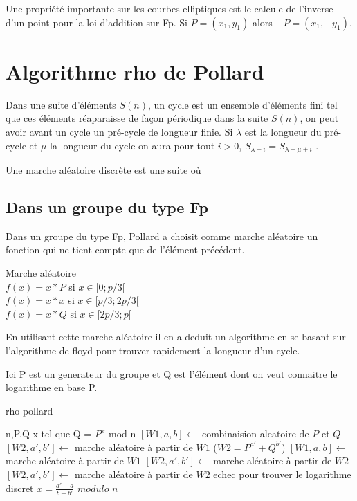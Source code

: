 \documentclass[a4paper,10pt]{report}
\begin{document}
Une propriété importante sur les courbes elliptiques est le calcule de l'inverse d'un point pour la loi d'addition sur Fp. Si $P = (x_1,y_1)$ alors $-P = (x_1,-y_1)$.

\section{Algorithme rho de Pollard}

Dans une suite d'éléments $S(n)$, un cycle est un ensemble d'éléments fini tel que ces éléments réaparaisse de façon périodique dans la suite $S(n)$, on peut avoir avant un cycle un pré-cycle de longueur finie.
Si $\lambda$ est la longueur du pré-cycle et $\mu$ la longueur du cycle on aura pour tout $i > 0$, $S_{\lambda+i} = S_{\lambda+\mu+i}$ .

Une marche aléatoire discrète est une suite où 

\subsection{Dans un groupe du type Fp}

Dans un groupe du type Fp, Pollard a choisit comme marche aléatoire un fonction qui ne tient compte que de l'élément précédent.\\

\begin{description}
\item{Marche aléatoire}\\
{
$ f(x) = x*P$ si $x \in [0;p/3[$\\
$ f(x) = x*x$ si $x \in [p/3;2p/3[$\\
$ f(x) = x*Q$ si $x \in [2p/3;p[$\\
}
\end{description}

En utilisant cette marche aléatoire il en a deduit un algorithme en se basant sur l'algorithme de floyd pour trouver rapidement la longueur d'un cycle.

Ici P est un generateur du groupe et Q est l'élément dont on veut connaitre le logarithme en base P.
 
{
 \begin{algorithm}
 \caption{rho pollard}
 \begin{algorithmic}
  \REQUIRE n,P,Q
  \ENSURE x tel que Q = $P^x$ mod n
  \STATE $[W1,a,b] \leftarrow$ combinaision aleatoire de $P$ et $Q$
    \STATE $[W2,a',b'] \leftarrow$  marche aléatoire à partir de $W1$
	\STATE ($W2 = P^{a'} + Q^{b'}$)
      \STATE $[W1,a,b] \leftarrow$ marche aléatoire à partir de $W1$
      \STATE $[W2,a',b'] \leftarrow$ marche aléatoire à partir de $W2$
      \STATE $[W2,a',b'] \leftarrow$ marche aléatoire à partir de $W2$
    \ENDWHILE
    \STATE echec pour trouver le logarithme discret
  \ELSE
    \STATE $ x = \frac{a'-a}{b-b'}$ $modulo$ $n$
  \ENDIF
 
 \end{algorithmic}
 \end{algorithm}
 }
\end{document}
